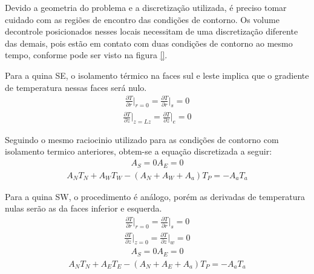 \documentclass[
	12pt,				%
	openright,			%
	oneside,			%
	a4paper,			%
	english,			%
	french,				%
	spanish,			%
	brazil				%
	]{abntex2}
\begin{document}
Devido a geometria do problema e a discretização utilizada, é preciso tomar cuidado com as regiões de encontro das condições de contorno. Os volume decontrole posicionados nesses locais necessitam de uma discretização diferente das demais, pois estão em contato com duas condições de contorno ao mesmo tempo, conforme pode ser visto na figura \ref{}.

Para a quina SE, o isolamento térmico na faces sul e leste implica que o gradiente de temperatura nessas faces será nulo.
\begin{gather}
\frac{\partial T}{\partial r}\biggr\rvert_{r=0}=
\frac{\partial T}{\partial r}\biggr\rvert_{s}=0
\end{gather}
\begin{gather}     
\frac{\partial T}{\partial z}\biggr\rvert_{z=Lz}=
\frac{\partial T}{\partial z}\biggr\rvert_{e}=0
\end{gather}

Seguindo o mesmo raciocinio utilizado para as condições de contorno com isolamento termico anteriores, obtem-se a equação discretizada a seguir:
\begin{gather}
A_S=0 
A_E=0
\end{gather}
\begin{gather}
A_N T_N+A_W T_W-(A_N+A_W+A_a)T_P=-A_a T_a
\end{gather} 

Para a quina SW, o procedimento é análogo, porém as derivadas de temperatura nulas serão as da faces inferior e esquerda.
\begin{gather}
\frac{\partial T}{\partial r}\biggr\rvert_{r=0}=
\frac{\partial T}{\partial r}\biggr\rvert_{s}=0
\end{gather}
\begin{gather}     
\frac{\partial T}{\partial z}\biggr\rvert_{z=0}=
\frac{\partial T}{\partial z}\biggr\rvert_{w}=0
\end{gather}
\begin{gather}
A_S=0 
A_E=0
\end{gather}
\begin{gather}
A_N T_N+A_E T_E-(A_N+A_E+A_a)T_P=-A_a T_a
\end{gather} 
\end{document}
